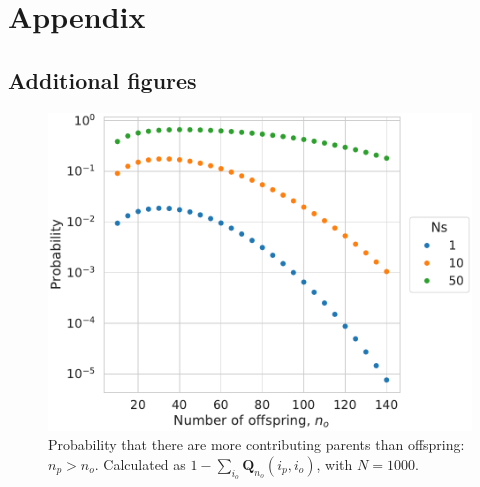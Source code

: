\documentclass[review,nonatbib]{elsarticle}
\begin{document}
% 
\printbibliography

\section{Appendix}

\subsection{Additional figures}
\label{subsec_apx_figures}


\begin{figure}[H]
  \centering
  \includegraphics[width=\textwidth]{fig/missing.pdf}
  \caption{Probability that there are more contributing parents than offspring: $n_p > n_o$.
    Calculated as $1-\sum_{i_o} \mathbf{Q}_{n_o}{(i_p, i_o)}$, with $N=1000$.}
  \label{fig_apx_missing}
\end{figure}


\end{document}

